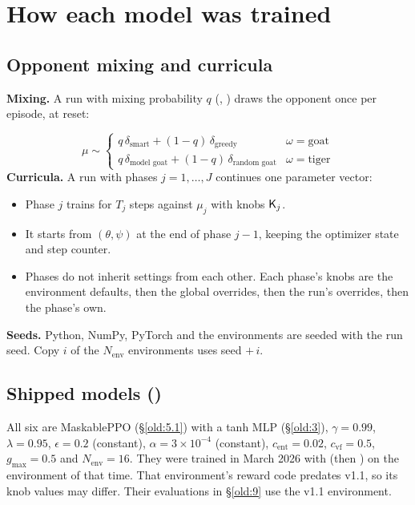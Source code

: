 \section{How each model was trained}\label{old:6}

\subsection{Opponent mixing and curricula}\label{old:6.1}

\textbf{Mixing.} A run with mixing probability $q$ (, ) draws the opponent once per episode, at reset:

\[
\mu \sim \begin{cases} q\,\delta_{\text{smart}} + (1-q)\,\delta_{\text{greedy}} & \omega = \text{goat} \\ q\,\delta_{\text{model goat}} + (1-q)\,\delta_{\text{random goat}} & \omega = \text{tiger} \end{cases}
\]
\textbf{Curricula.} A run with phases $j = 1, \dots, J$ continues one parameter vector:

\begin{itemize}
\item Phase $j$ trains for $T_j$ steps against $\mu_j$ with knobs $\knob{K}_j$.
\item It starts from $(\theta, \psi)$ at the end of phase $j-1$, keeping the optimizer state and step counter.
\item Phases do not inherit settings from each other. Each phase's knobs are the environment defaults, then the global overrides, then the run's overrides, then the phase's own.
\end{itemize}
\textbf{Seeds.} Python, NumPy, PyTorch and the environments are seeded with the run seed. Copy $i$ of the $N_{\text{env}}$ environments uses seed $+\, i$.

\subsection{Shipped models ()}\label{old:6.2}

All six are MaskablePPO (\S\ref{old:5.1}) with a tanh MLP (\S\ref{old:3}), $\gamma = 0.99$, $\lambda = 0.95$, $\epsilon = 0.2$ (constant), $\alpha = 3\times10^{-4}$ (constant), $c_{\text{ent}} = 0.02$, $c_{\text{vf}} = 0.5$, $g_{\max} = 0.5$ and $N_{\text{env}} = 16$. They were trained in March 2026 with  (then ) on the environment of that time. That environment's reward code predates v1.1, so its knob values may differ. Their evaluations in \S\ref{old:9} use the v1.1 environment.

